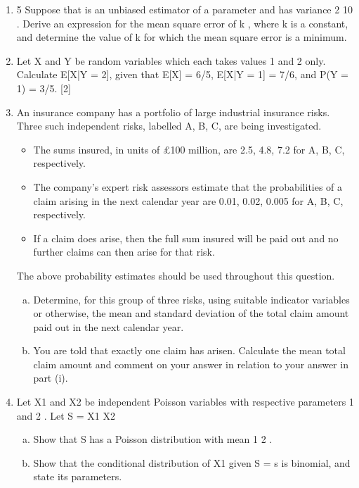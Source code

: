 \documentclass[a4paper,12pt]{article}
\begin{document}
\begin{enumerate}
\item
5 Suppose that is an unbiased estimator of a parameter and has variance
2
10
.
Derive an expression for the mean square error of k , where k is a constant, and
determine the value of k for which the mean square error is a minimum.
\item Let X and Y be random variables which each takes values 1 and 2 only.
Calculate E[X|Y = 2], given that E[X] = 6/5, E[X|Y = 1] = 7/6, and P(Y = 1) = 3/5.
[2]
\item An insurance company has a portfolio of large industrial insurance risks. Three such
independent risks, labelled A, B, C, are being investigated.
\begin{itemize}
    \item The sums insured, in units
of £100 million, are 2.5, 4.8, 7.2 for A, B, C, respectively.
\item The company's expert risk
assessors estimate that the probabilities of a claim arising in the next calendar year are
0.01, 0.02, 0.005 for A, B, C, respectively. 
\item If a claim does arise, then the full sum
insured will be paid out and no further claims can then arise for that risk. 
\end{itemize}
The above
probability estimates should be used throughout this question.
\begin{enumerate}[(a)]
\item  Determine, for this group of three risks, using suitable indicator variables or
otherwise, the mean and standard deviation of the total claim amount paid out
in the next calendar year.
\item You are told that exactly one claim has arisen. Calculate the mean total claim
amount and comment on your answer in relation to your answer in part (i).
\end{enumerate}
\item Let X1 and X2 be independent Poisson variables with respective parameters 1
and 2 .
Let S = X1 X2
\begin{enumerate}[(a)]
\item  Show that S has a Poisson distribution with mean 1 2 . 
\item  Show that the conditional distribution of X1 given S = s is binomial, and state its parameters.
\end{enumerate}
\end{enumerate}
\end{document}
